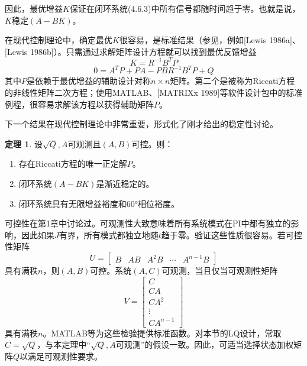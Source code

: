 \documentclass[UTF8]{ctexart}
\theoremstyle{definition}
\newtheorem{theorem}{定理}[section]
\begin{document}
因此，最优增益$K$保证在闭环系统(4.6.3)中所有信号都随时间趋于零。也就是说，$K$稳定$(A - BK)$。

在现代控制理论中，确定最优$K$很容易，是标准结果（参见，例如[Lewis 1986a]、[Lewis 1986b]）。只需通过求解矩阵设计方程就可以找到最优反馈增益
\begin{equation}\label{eq:4.6.5}
    K = R^{-1}B^TP
\end{equation}
\begin{equation}
    0 = A^TP + PA - PBR^{-1}B^TP + Q
\end{equation}
其中$P$是依赖于最优增益的辅助设计对称$n \times n$矩阵。第二个是被称为Riccati方程的非线性矩阵二次方程；使用MATLAB、[MATRIXx 1989]等软件设计包中的标准例程，很容易求解该方程以获得辅助矩阵$P$。

下一个结果在现代控制理论中非常重要，形式化了刚才给出的稳定性讨论。

\begin{theorem}
设$\sqrt{Q}, A$可观测且$(A, B)$可控。则：
\begin{enumerate}[label=(\alph*)]
\item 存在Riccati方程的唯一正定解$P$。
\item 闭环系统$(A - BK)$是渐近稳定的。
\item 闭环系统具有无限增益裕度和$60°$相位裕度。
\end{enumerate}
\end{theorem}

可控性在第1章中讨论过。可观测性大致意味着所有系统模式在PI中都有独立的影响，因此如果$J$有界，所有模式都独立地随$t$趋于零。验证这些性质很容易。若可控性矩阵
\begin{equation}\label{eq:4.6.7}
    U = \begin{bmatrix} B & AB & A^2B & \cdots & A^{n-1}B \end{bmatrix}
\end{equation}
具有满秩$n$，则$(A,B)$可控。系统$(A,C)$可观测，当且仅当可观测性矩阵
\begin{equation}\label{eq:4.6.8}
    V = \begin{bmatrix} C \\ CA \\ CA^2 \\ \vdots \\ CA^{n-1} \end{bmatrix}
\end{equation}
具有满秩$n$。MATLAB等为这些检验提供标准函数。对本节的LQ设计，常取$C=\sqrt{Q}$，与本定理中“$\sqrt{Q},A$可观测”的假设一致。因此，可适当选择状态加权矩阵$Q$以满足可观测性要求。
\end{document}

